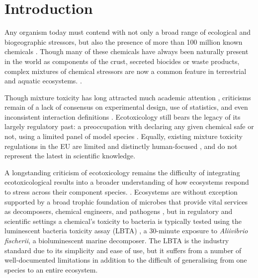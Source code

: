 \documentclass[final,1p,times]{elsarticle}
\begin{document}
\linenumbers

\section{Introduction}
\label{S:1}

Any organism today must contend with not only a broad range of ecological and biogeographic stressors, but also the presence of more than 100 million known chemicals \cite{CAS2015}. Though many of these chemicals have always been naturally present in the world as components of the crust, secreted biocides or waste products, complex mixtures of chemical stressors are now a common feature in terrestrial and aquatic ecosystems. \cite{EuropeanCommission2012a}. 

Though mixture toxicity has long attracted much academic attention \cite{Bliss1939}, criticisms remain of a lack of consensus on experimental design, use of statistics, and even inconsistent interaction definitions \cite{Jackson2016,Piggott2015,Schafer2018}. Ecotoxicology still bears the legacy of its largely regulatory past: a preoccupation with declaring any given chemical safe or not, using a limited panel of model species \cite{OECD2014SectionSystems}. Equally, existing mixture toxicity regulations in the EU are limited and distinctly human-focused \cite{EuropeanCommission2012a}, and do not represent the latest in scientific knowledge.

A longstanding criticism of ecotoxicology remains the difficulty of integrating ecotoxicological results into a broader understanding of how ecosystems respond to stress across their component species. \cite{Chapman2002a,Gessner2016}. Ecosystems are without exception supported by a broad trophic foundation of microbes that provide vital services as decomposers, chemical engineers, and pathogens \cite{Nannipieri2003a,VanderHeijden2008a}, but in regulatory and scientific settings a chemical's toxicity to bacteria is typically tested using the luminescent bacteria toxicity assay (LBTA) \cite{OECD2014SectionSystems}, a 30-minute exposure to \textit{Aliivibrio fischerii}, a bioluminescent marine decomposer. The LBTA is the industry standard due to its simplicity and ease of use, but it suffers from a number of well-documented limitations \cite{Ma2014} in addition to the difficult of generalising from one species to an entire ecosystem.
\end{document}
